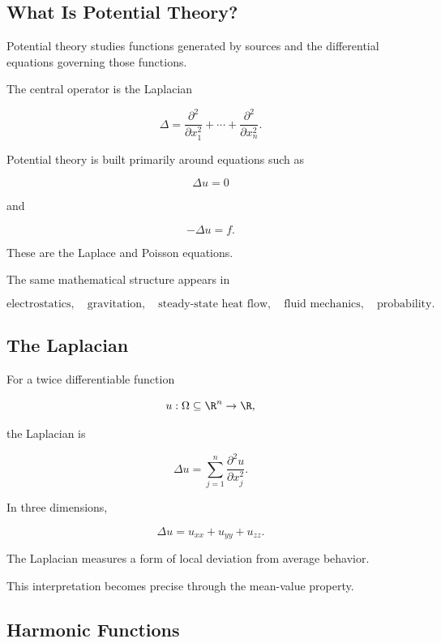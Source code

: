 \subsection{What Is Potential Theory?}
\label{subsec:what-is-potential-theory}

Potential theory studies functions generated by sources and the
differential equations governing those functions.

The central operator is the Laplacian

\[
\boxed{
\Delta
=
\frac{\partial^2}{\partial x_1^2}
+\cdots+
\frac{\partial^2}{\partial x_n^2}.
}
\]

Potential theory is built primarily around equations such as

\[
\boxed{
\Delta u=0
}
\]

and

\[
\boxed{
-\Delta u=f.
}
\]

These are the Laplace and Poisson equations.

The same mathematical structure appears in

\[
\boxed{
\text{electrostatics},
\quad
\text{gravitation},
\quad
\text{steady-state heat flow},
\quad
\text{fluid mechanics},
\quad
\text{probability}.
}
\]

\subsection{The Laplacian}
\label{subsec:potential-laplacian}

For a twice differentiable function

\[
u:\Omega\subseteq\R^n\to\R,
\]

the Laplacian is

\[
\boxed{
\Delta u
=
\sum_{j=1}^{n}
\frac{\partial^2u}{\partial x_j^2}.
}
\]

In three dimensions,

\[
\boxed{
\Delta u
=
u_{xx}+u_{yy}+u_{zz}.
}
\]

The Laplacian measures a form of local deviation from average behavior.

This interpretation becomes precise through the mean-value property.

\subsection{Harmonic Functions}
\label{subsec:harmonic-functions-potential}

